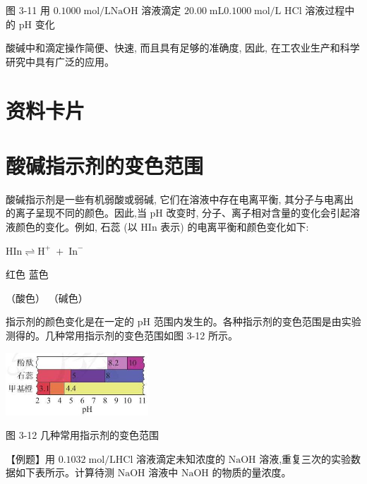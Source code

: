 \documentclass[10pt]{article}
\begin{document}
图 3-11 用 \({0.1000}\mathrm{\;{mol}}/\mathrm{L}\mathrm{{NaOH}}\) 溶液滴定 \({20.00}\mathrm{\;{mL}}{0.1000}\mathrm{\;{mol}}/\mathrm{L}\) \(\mathrm{{HCl}}\) 溶液过程中的 \(\mathrm{{pH}}\) 变化

酸碱中和滴定操作简便、快速, 而且具有足够的准确度, 因此, 在工农业生产和科学研究中具有广泛的应用。

\section*{资料卡片}

\section*{酸碱指示剂的变色范围}

酸碱指示剂是一些有机弱酸或弱碱, 它们在溶液中存在电离平衡, 其分子与电离出的离子呈现不同的颜色。因此,当 \(\mathrm{{pH}}\) 改变时, 分子、离子相对含量的变化会引起溶液颜色的变化。例如, 石蕊 (以 HIn 表示) 的电离平衡和颜色变化如下:

\(\mathrm{{HIn}} \rightleftharpoons {\mathrm{H}}^{ + }\; + \;{\mathrm{{In}}}^{ - }\)

红色 蓝色

（酸色） （碱色）

指示剂的颜色变化是在一定的 \(\mathrm{{pH}}\) 范围内发生的。各种指示剂的变色范围是由实验测得的。几种常用指示剂的变色范围如图 3-12 所示。

\begin{center}
\includegraphics[max width=0.4\textwidth]{images/0190da9d-8bfd-732f-bc2c-0b21d0f13b91_73_308830.jpg}
\end{center}

图 3-12 几种常用指示剂的变色范围

【例题】用 \({0.1032}\mathrm{\;{mol}}/\mathrm{L}\mathrm{{HCl}}\) 溶液滴定未知浓度的 \(\mathrm{{NaOH}}\) 溶液,重复三次的实验数据如下表所示。计算待测 \(\mathrm{{NaOH}}\) 溶液中 \(\mathrm{{NaOH}}\) 的物质的量浓度。

\begin{center}
\end{center}
\end{document}
